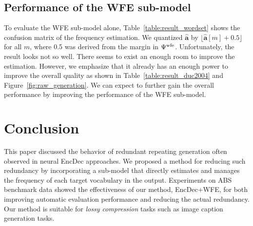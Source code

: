 \documentclass[11pt]{article}
\begin{document}
\subsection{Performance of the WFE sub-model}
To evaluate the WFE sub-model alone,
   Table~\ref{table:result_wordset} shows the confusion matrix of the frequency estimation.
We quantized $\hat{\bm{a}}$ by $\lfloor \hat{\bm{a}}[m]+0.5\rfloor$ for all $m$, where 0.5 was derived from the margin in $\Psi^{\rm wfe}$.
Unfortunately, the result looks not so well.
   There seems to exist an enough room to improve the estimation.
However, we emphasize that it already has an enough power to improve the overall quality as shown in Table~\ref{table:result_duc2004} and Figure~\ref{fig:raw_generation}.
We can expect to further gain the overall performance by improving the performance of the WFE sub-model.


\section{Conclusion}
   This paper discussed the behavior of redundant repeating generation often observed in neural EncDec approaches.
We proposed a method for reducing such redundancy by incorporating a sub-model that directly estimates and manages the frequency of each target vocabulary in the output.
Experiments on ABS benchmark data showed the effectiveness of our method, EncDec+WFE, for both improving automatic evaluation performance and reducing the actual redundancy.
Our method is suitable for {\it lossy compression} tasks such as image caption generation tasks.
\end{document}
